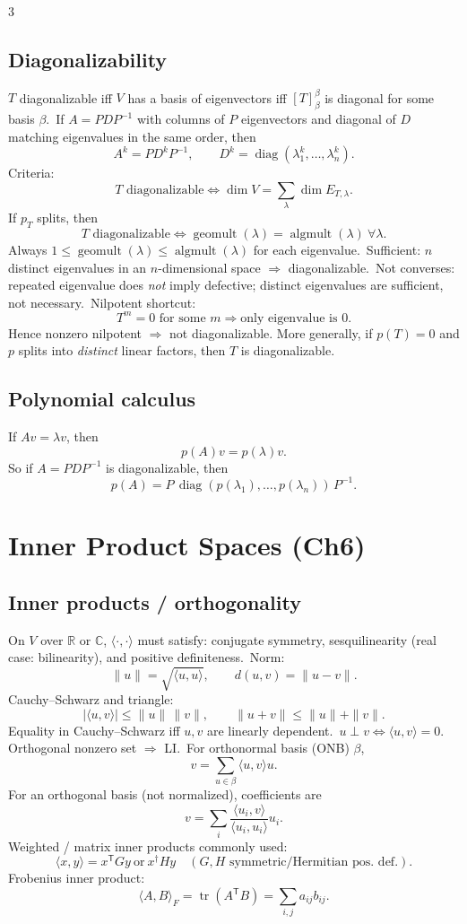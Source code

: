 \documentclass[10pt]{article}
\newcommand{\R}{\mathbb{R}}
\newcommand{\C}{\mathbb{C}}
\newcommand{\tr}{\operatorname{tr}}
\newcommand{\diag}{\operatorname{diag}}
\newcommand{\algmult}{\operatorname{algmult}}
\newcommand{\geomult}{\operatorname{geomult}}
\newcommand{\ip}[2]{\langle #1,#2\rangle}
\begin{document}
\begin{multicols}{3}
\subsection*{Diagonalizability}
$T$ diagonalizable iff $V$ has a basis of eigenvectors iff $[T]^\beta_\beta$ is diagonal for some basis $\beta$.\
If $A=PDP^{-1}$ with columns of $P$ eigenvectors and diagonal of $D$ matching eigenvalues in the same order, then
\[
A^k=PD^kP^{-1},\qquad D^k=\diag(\lambda_1^k,\dots,\lambda_n^k).
\]
Criteria:
\[
T\text{ diagonalizable}\iff \dim V=\sum_\lambda \dim E_{T,\lambda}.
\]
If $p_T$ splits, then
\[
T\text{ diagonalizable}\iff \geomult(\lambda)=\algmult(\lambda)\ \forall\lambda.
\]
Always $1\le \geomult(\lambda)\le \algmult(\lambda)$ for each eigenvalue.\
Sufficient: $n$ distinct eigenvalues in an $n$-dimensional space $\Rightarrow$ diagonalizable.\
Not converses: repeated eigenvalue does \emph{not} imply defective; distinct eigenvalues are sufficient, not necessary.\
Nilpotent shortcut:
\[
T^m=0\text{ for some }m\Rightarrow \text{only eigenvalue is }0.
\]
Hence nonzero nilpotent $\Rightarrow$ not diagonalizable. More generally, if $p(T)=0$ and $p$ splits into \emph{distinct} linear factors, then $T$ is diagonalizable.

\subsection*{Polynomial calculus}
If $Av=\lambda v$, then
\[
p(A)v=p(\lambda)v.
\]
So if $A=PDP^{-1}$ is diagonalizable, then
\[
p(A)=P\,\diag(p(\lambda_1),\dots,p(\lambda_n))\,P^{-1}.
\]

\section*{Inner Product Spaces (Ch6)}

\subsection*{Inner products / orthogonality}
On $V$ over $\R$ or $\C$, $\ip{\cdot}{\cdot}$ must satisfy: conjugate symmetry, sesquilinearity (real case: bilinearity), and positive definiteness.\
Norm:
\[
\|u\|=\sqrt{\ip{u}{u}},\qquad d(u,v)=\|u-v\|.
\]
Cauchy--Schwarz and triangle:
\[
|\ip{u}{v}|\le \|u\|\,\|v\|,\qquad \|u+v\|\le \|u\|+\|v\|.
\]
Equality in Cauchy--Schwarz iff $u,v$ are linearly dependent.\
$u\perp v\iff \ip{u}{v}=0$. Orthogonal nonzero set $\Rightarrow$ LI.\
For orthonormal basis (ONB) $\beta$,
\[
v=\sum_{u\in\beta}\ip{u}{v}u.
\]
For an orthogonal basis (not normalized), coefficients are
\[
v=\sum_i \frac{\ip{u_i}{v}}{\ip{u_i}{u_i}}u_i.
\]
Weighted / matrix inner products commonly used:
\[
\ip{x}{y}=x^{\mathsf T}Gy\ \text{or}\ x^\dagger Hy\quad (G,H\text{ symmetric/Hermitian pos. def.}).
\]
Frobenius inner product:
\[
\ip{A}{B}_F=\tr(A^{\mathsf T}B)=\sum_{i,j}a_{ij}b_{ij}.
\]


\end{multicols}
\end{document}
